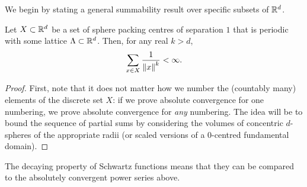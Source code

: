 We begin by stating a general summability result over specific subsets of $\mathbb{R}^d$.

\begin{lemma}\label{lemma:inv-power-summable}\leanok
  Let $X \subset \mathbb{R}^d$ be a set of sphere packing centres of separation $1$ that is periodic with some lattice $\Lambda \subset \mathbb{R}^d$. Then, for any real $k > d$,
  \[
    \sum_{x \in X} \frac{1}{\left\lVert x \right\rVert^{k}} < \infty.
  \]
\end{lemma}
\begin{proof}
  First, note that it does not matter how we number the (countably many) elements of the discrete set $X$: if we prove absolute convergence for one numbering, we prove absolute convergence for \emph{any} numbering. The idea will be to bound the sequence of partial sums by considering the volumes of concentric $d$-spheres of the appropriate radii (or scaled versions of a $0$-centred fundamental domain).



\end{proof}

The decaying property of Schwartz functions means that they can be compared to the absolutely convergent power series above.

